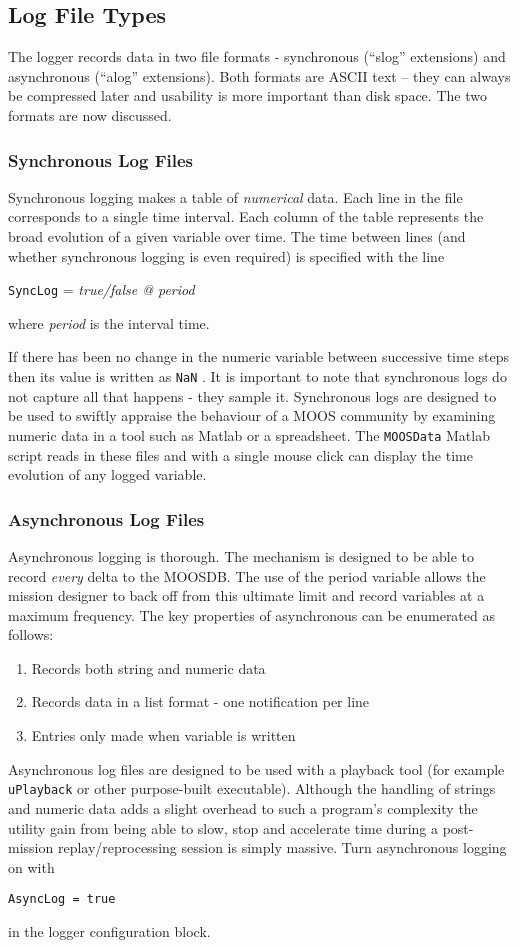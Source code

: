 \documentclass[a4paper,10pt]{article}
\newcommand{\Code}[1]{\texttt{#1} }
\newcommand{\code}[1]{\Code{#1} }
\begin{document}
\subsection{Log File Types}\label{sec:LogTypes}
The logger records data in two file formats - synchronous
(``slog'' extensions) and asynchronous (``alog'' extensions). Both
formats are ASCII text -- they can always be compressed later and
usability is more important than disk space. The two formats are
now discussed.

\subsubsection{Synchronous Log Files}
Synchronous logging makes a table of {\em{numerical}} data. Each
line in the file corresponds to a single time interval. Each
column of the table represents the broad evolution of a given
variable over time. The time between lines (and whether
synchronous logging is even required) is specified with the line
\begin{center}
\code{SyncLog}= {\it{true/false @ period}}
\end{center}
where {\it{period}} is the interval time.

If there has been no change in the numeric variable between
successive time steps then its value is written as \code{NaN}. It
is important to note that synchronous logs do not capture all that
happens - they sample it. Synchronous logs are designed to be used
to swiftly appraise the behaviour of a MOOS community by examining
numeric data in a tool such as Matlab or a spreadsheet. The
\code{MOOSData} Matlab script reads in these files and with a
single mouse click can display the time evolution of any logged
variable.


\subsubsection{Asynchronous Log Files}
Asynchronous logging is thorough. The mechanism is designed to be
able to record {\em{every}} delta to the MOOSDB. The use of the
period variable allows the mission designer to back off from this
ultimate limit and record variables at a maximum frequency. The
key properties of asynchronous can be enumerated as follows:
\begin{enumerate}
\item Records both string and numeric data
\item Records data in a list format - one notification per line
\item Entries only made when variable is written
\end{enumerate}
Asynchronous log files are designed to be used with a playback
tool (for example \code{uPlayback} or other purpose-built
executable). Although the handling of strings and numeric data
adds a slight overhead to such a program's complexity the utility
gain from being able to slow, stop and accelerate time during a
post-mission replay/reprocessing session is simply massive. Turn asynchronous logging on with
\begin{center}
\code{AsyncLog = true}
\end{center}
in the logger configuration block.
\end{document}
